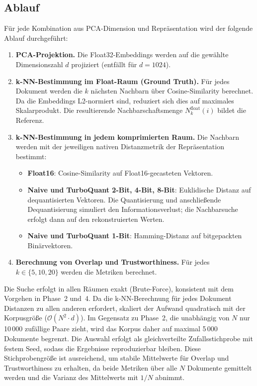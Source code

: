 \subsection{Ablauf}
%
Für jede Kombination aus PCA-Dimension und Repräsentation wird der folgende Ablauf durchgeführt:
\begin{enumerate}
  \item \textbf{PCA-Projektion.} Die Float32-Embeddings werden auf die gewählte Dimensionszahl $d$ projiziert (entfällt für $d = 1024$).
  \item \textbf{k-NN-Bestimmung im Float-Raum (Ground Truth).} Für jedes Dokument werden die $k$ nächsten Nachbarn über Cosine-Similarity berechnet.
Da die Embeddings L2-normiert sind, reduziert sich dies auf maximales Skalarprodukt.
Die resultierende Nachbarschaftsmenge $N_k^\text{float}(i)$ bildet die Referenz.
  \item \textbf{k-NN-Bestimmung in jedem komprimierten Raum.} Die Nachbarn werden mit der jeweiligen nativen Distanzmetrik der Repräsentation bestimmt:
  \begin{itemize}
    \item \textbf{Float16}: Cosine-Similarity auf Float16-gecasteten Vektoren.
    \item \textbf{Naive und TurboQuant 2-Bit, 4-Bit, 8-Bit}: Euklidische Distanz auf dequantisierten Vektoren.
Die Quantisierung und anschließende Dequantisierung simuliert den Informationsverlust; die Nachbarsuche erfolgt dann auf den rekonstruierten Werten.
    \item \textbf{Naive und TurboQuant 1-Bit}: Hamming-Distanz auf bitgepackten Binärvektoren.
  \end{itemize}
  \item \textbf{Berechnung von Overlap und Trustworthiness.} Für jedes $k \in \{5, 10, 20\}$ werden die Metriken berechnet.
\end{enumerate}
%
Die Suche erfolgt in allen Räumen exakt (Brute-Force), konsistent mit dem Vorgehen in Phase~2 und~4.
%
Da die k-NN-Berechnung für jedes Dokument Distanzen zu allen anderen erfordert, skaliert der Aufwand quadratisch mit der Korpusgröße ($\mathcal{O}(N^2 \cdot d)$).
Im Gegensatz zu Phase~2, die unabhängig von $N$ nur 10\,000 zufällige Paare zieht, wird das Korpus daher auf maximal 5\,000 Dokumente begrenzt.
Die Auswahl erfolgt als gleichverteilte Zufallsstichprobe mit festem Seed, sodass die Ergebnisse reproduzierbar bleiben.
Diese Stichprobengröße ist ausreichend, um stabile Mittelwerte für Overlap und Trustworthiness zu erhalten, da beide Metriken über alle $N$ Dokumente gemittelt werden und die Varianz des Mittelwerts mit $1/N$ abnimmt.
%

